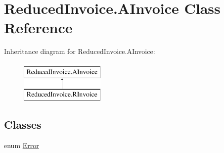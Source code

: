 \hypertarget{class_reduced_invoice_1_1_a_invoice}{\section{Reduced\-Invoice.\-A\-Invoice Class Reference}
\label{class_reduced_invoice_1_1_a_invoice}
}
Inheritance diagram for Reduced\-Invoice.\-A\-Invoice\-:\begin{figure}[H]
\begin{center}
\leavevmode
\includegraphics[height=2.000000cm]{class_reduced_invoice_1_1_a_invoice}
\end{center}
\end{figure}
\subsection*{Classes}
\begin{DoxyCompactItemize}
\item 
enum \hyperlink{enum_reduced_invoice_1_1_a_invoice_1_1_error}{Error}
\end{DoxyCompactItemize}

